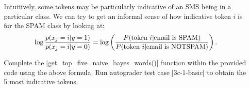 \item {}
Intuitively, some tokens may be particularly indicative of an SMS being
in a particular class.  We can try to get an informal sense of how indicative
token $i$ is for the SPAM class by looking at:
\begin{equation*}
  \log \frac{p(x_j = i\vert  y=1)}{p(x_j = i\vert y=0)}
  = \log\left(\frac{P(\hbox{token $i$} \vert  \hbox{email is SPAM})}
    {P(\hbox{token $i$} \vert  \hbox{email is NOTSPAM})}\right).
\end{equation*}

Complete the |get_top_five_naive_bayes_words()| function within the provided code using the above formula.  Run autograder test case |3c-1-basic| to obtain the 5 most indicative tokens.